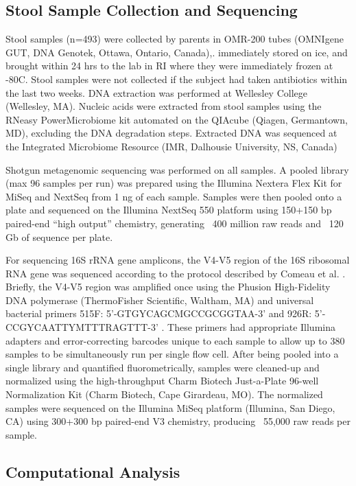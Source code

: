 \documentclass[fleqn,10pt]{wlscirep}
\begin{document}
\subsection*{Stool Sample Collection and Sequencing}

Stool samples (n=493) were collected by parents in OMR-200 tubes (OMNIgene GUT, DNA Genotek, Ottawa, Ontario, Canada),.
immediately stored on ice, and brought within 24 hrs to the lab in RI where they were immediately frozen at -80\deg C.
Stool samples were not collected if the subject had taken antibiotics within the last two weeks.
DNA extraction was performed at Wellesley College (Wellesley, MA).
Nucleic acids were extracted from stool samples using the RNeasy PowerMicrobiome kit
automated on the QIAcube (Qiagen, Germantown, MD), excluding the DNA degradation steps.
Extracted DNA was sequenced at the Integrated Microbiome Resource (IMR, Dalhousie University, NS, Canada)

Shotgun metagenomic sequencing was performed on all samples.
A pooled library (max 96 samples per run) was prepared using the Illumina Nextera Flex Kit for MiSeq and NextSeq from 1 ng of each sample.
Samples were then pooled onto a plate and sequenced
on the Illumina NextSeq 550 platform using 150+150 bp paired-end “high output” chemistry,
generating ~400 million raw reads and ~120 Gb of sequence per plate.

For sequencing 16S rRNA gene amplicons,
the V4-V5 region of the 16S ribosomal RNA gene was sequenced according to the protocol
described by Comeau et al. \cite{Comeau2017-jg}.
Briefly, the V4-V5 region was amplified once using the Phusion High-Fidelity DNA polymerase
(ThermoFisher Scientific, Waltham, MA) and universal bacterial primers
515F: 5’-GTGYCAGCMGCCGCGGTAA-3’ and 926R: 5’-CCGYCAATTYMTTTRAGTTT-3’ \cite{Parada2016-uz,Walters2016-fi}.
These primers had appropriate Illumina adapters and error-correcting barcodes unique to each sample
to allow up to 380 samples to be simultaneously run per single flow cell.
After being pooled into a single library and quantified fluorometrically,
samples were cleaned-up and normalized using the high-throughput Charm Biotech Just-a-Plate 96-well Normalization Kit (Charm Biotech, Cape Girardeau, MO).
The normalized samples were sequenced on the Illumina MiSeq platform (Illumina, San Diego, CA)
using 300+300 bp paired-end V3 chemistry, producing ~55,000 raw reads per sample.

\subsection*{Computational Analysis}
\end{document}
